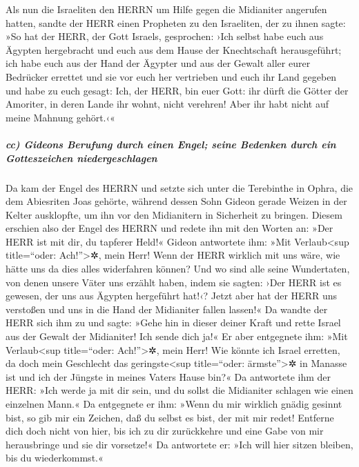 Als nun die Israeliten den HERRN um Hilfe gegen die
Midianiter angerufen hatten, sandte der HERR einen
Propheten zu den Israeliten, der zu ihnen sagte: »So hat der HERR, der
Gott Israels, gesprochen: ›Ich selbst habe euch aus Ägypten hergebracht
und euch aus dem Hause der Knechtschaft herausgeführt; ich
habe euch aus der Hand der Ägypter und aus der Gewalt aller eurer
Bedrücker errettet und sie vor euch her vertrieben und euch ihr Land
gegeben und habe zu euch gesagt: Ich, der HERR, bin euer
Gott: ihr dürft die Götter der Amoriter, in deren Lande ihr wohnt, nicht
verehren! Aber ihr habt nicht auf meine Mahnung gehört.‹«

\hypertarget{cc-gideons-berufung-durch-einen-engel-seine-bedenken-durch-ein-gotteszeichen-niedergeschlagen}{%
\subparagraph{cc) Gideons Berufung durch einen Engel; seine Bedenken
durch ein Gotteszeichen
niedergeschlagen}\label{cc-gideons-berufung-durch-einen-engel-seine-bedenken-durch-ein-gotteszeichen-niedergeschlagen}}

Da kam der Engel des HERRN und setzte sich unter die
Terebinthe in Ophra, die dem Abiesriten Joas gehörte, während dessen
Sohn Gideon gerade Weizen in der Kelter ausklopfte, um ihn vor den
Midianitern in Sicherheit zu bringen. Diesem erschien
also der Engel des HERRN und redete ihn mit den Worten an: »Der HERR ist
mit dir, du tapferer Held!« Gideon antwortete ihm: »Mit
Verlaub\textless sup title=``oder: Ach!''\textgreater✲, mein Herr! Wenn
der HERR wirklich mit uns wäre, wie hätte uns da dies alles widerfahren
können? Und wo sind alle seine Wundertaten, von denen unsere Väter uns
erzählt haben, indem sie sagten: ›Der HERR ist es gewesen, der uns aus
Ägypten hergeführt hat!‹? Jetzt aber hat der HERR uns verstoßen und uns
in die Hand der Midianiter fallen lassen!« Da wandte der
HERR sich ihm zu und sagte: »Gehe hin in dieser deiner Kraft und rette
Israel aus der Gewalt der Midianiter! Ich sende dich ja!«
Er aber entgegnete ihm: »Mit Verlaub\textless sup
title=``oder: Ach!''\textgreater✲, mein Herr! Wie könnte ich Israel
erretten, da doch mein Geschlecht das geringste\textless sup
title=``oder: ärmste''\textgreater✲ in Manasse ist und ich der Jüngste
in meines Vaters Hause bin?« Da antwortete ihm der HERR:
»Ich werde ja mit dir sein, und du sollst die Midianiter schlagen wie
einen einzelnen Mann.« Da entgegnete er ihm: »Wenn du mir
wirklich gnädig gesinnt bist, so gib mir ein Zeichen, daß du selbst es
bist, der mit mir redet! Entferne dich doch nicht von
hier, bis ich zu dir zurückkehre und eine Gabe von mir herausbringe und
sie dir vorsetze!« Da antwortete er: »Ich will hier sitzen bleiben, bis
du wiederkommst.«


